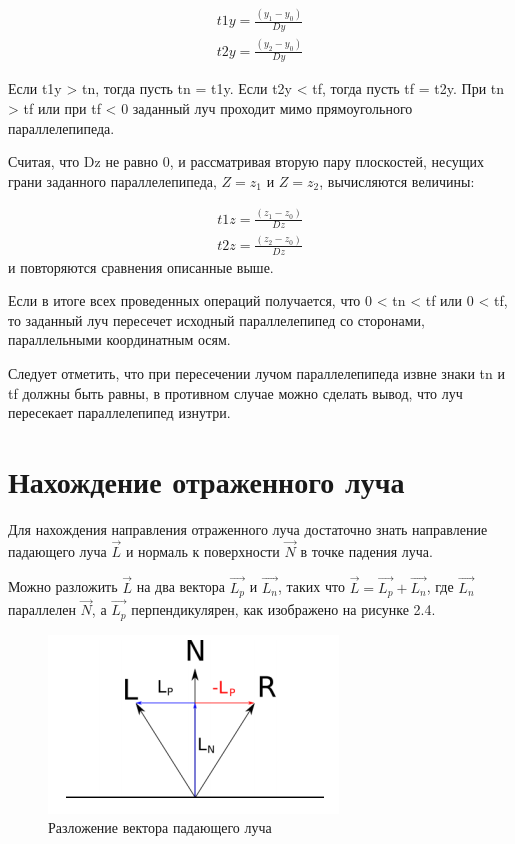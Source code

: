 \documentclass[12pt,a4paper,oneside]{report}
\begin{document}
	\begin{equation}
	\begin{gathered}
	t1y = \frac{(y_1 - y_0)}{Dy}\\
	t2y = \frac{(y_2 - y_0)}{Dy}
	\end{gathered}
	\end{equation}
	
	 Если t1y > tn, тогда пусть tn = t1y. Если t2y < tf, тогда пусть tf = t2y.
	При tn > tf или при tf < 0 заданный луч проходит мимо прямоугольного параллелепипеда.
	
	 Считая, что Dz не равно 0, и рассматривая вторую пару плоскостей, несущих грани заданного параллелепипеда, $Z = z_1$ и $Z = z_2$, вычисляются величины:
	
	\begin{equation}
	\begin{gathered}
	t1z = \frac{(z_1 - z_0)}{Dz}\\
	t2z = \frac{(z_2 - z_0)}{Dz}
	\end{gathered}
	\end{equation}
	и повторяются сравнения описанные выше.
	
	 Если в итоге всех проведенных операций получается, что 0 < tn < tf или 0 < tf, то заданный луч пересечет исходный параллелепипед со сторонами, параллельными координатным осям.
	
	 Следует отметить, что при пересечении лучом параллелепипеда извне знаки tn и tf должны быть равны, в противном случае можно сделать вывод, что луч пересекает параллелепипед изнутри.
	
	\section{Нахождение отраженного луча}
	
	 \quad Для нахождения направления отраженного луча достаточно знать направление падающего луча $\vec{L}$ и нормаль к поверхности $\vec{N}$ в точке падения луча.
	
	 Можно разложить $\vec{L}$ на два вектора $\vec{L_p}$ и $\vec{L_n}$, таких что $\vec{L} = \vec{L_p} + \vec{L_n}$, где $\vec{L_n}$ параллелен $\vec{N}$, а $\vec{L_p}$ перпендикулярен, как изображено на рисунке 2.4.
	
	
	\begin{figure}[h]
		\centering
		\includegraphics{reflect}
		\caption{Разложение вектора падающего луча}
	\end{figure}
\end{document}
